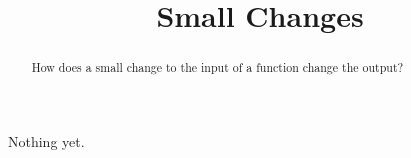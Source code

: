 \documentclass{ximera}
\title{Small Changes}
\begin{document}
\begin{abstract}
How does a small change to the input of a function change the output?
\end{abstract}
\maketitle


Nothing yet.
\end{document}
